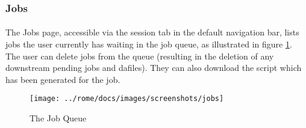 \subsubsection{Jobs}
\label{view_jobs}

\paragraph{}
The Jobs page, accessible via the session tab in the default navigation bar, lists jobs the user currently has waiting in the job queue, as illustrated in figure \ref{fig:view_jobs}. The user can delete jobs from the queue (resulting in the deletion of any downstream pending jobs and dafiles). They can also download the script which has been generated for the job.

\begin{figure}[h]
\centering
\texttt{[image: ../rome/docs/images/screenshots/jobs]}
\caption{The Job Queue}\label{fig:view_jobs}
\end{figure}

